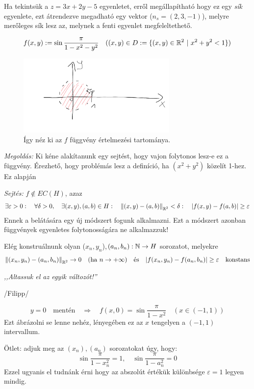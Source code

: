 \documentclass[a4paper,11.5pt]{article}
\newcommand{\norm}[1]{\left\lVert#1\right\rVert}
\begin{document}
	\begin{note}
		Ha tekintsük a $z=3x+2y-5$ egyenletet, erről megállapítható hogy ez egy \textit{sík} egyenlete, ezt átrendezve megadható egy vektor ($n_s=(2,3,-1)$), melyre merőleges sík lesz az, melynek a fenti egyenlet megfeleltethető.
	\end{note}
	\begin{task}
		\[ f(x,y):=\sin\frac{\pi}{1-x^2-y^2} \quad ((x,y)\in D:=\{ (x,y)\in\mathbb{R}^2 \ | \ x^2+y^2<1 \}) \]
		
		
		\begin{figure}[H]
			\centering
			\includegraphics[height=4cm]{../2zh/kepek/53.png}
			\caption{Így néz ki az $f$ függvény értelmezési tartománya.}
		\end{figure}
		
		
		\textit{Megoldás:} Ki kéne alakítanunk egy sejtést, hogy vajon folytonos lesz-e ez a függvény. Érezhető, hogy problémás lesz a definíció, ha $(x^2+y^2)$ közelít 1-hez. Ez alapján
		
		\textit{Sejtés:} $f\notin EC(H)$, azaz
		\[ \exists\varepsilon>0:\quad \forall\delta>0,\quad \exists(x,y),(a,b)\in H:\quad \norm{(x,y)-(a,b)}_{\R^2}<\delta:\quad |f(x,y)-f(a,b)|\geq \varepsilon  \]
		Ennek a belátására egy új módszert fogunk alkalmazni. Ezt a módszert azonban függvények egyenletes folytonosságára ne alkalmazzuk!
		
		Elég konstruálnunk olyan ($x_n,y_n$),$(a_n,b_n):\mathbb{N}\to H$ sorozatot, melyekre
		\[ \norm{(x_n,y_n)-(a_n,b_n)}_{\R^2}\to0\quad (\text{ha } n\to+\infty)\quad \text{és}\quad |f(x_n,y_n)-f(a_n,b_n)|\geq \varepsilon\quad \text{konstans} \] 
		\begin{center}
			\textit{,,Altassuk el az egyik változót!''}
			
			/Filipp/
		\end{center}
		\[ y=0\quad \text{mentén}\quad \Rightarrow\quad f(x,0)=\sin\frac{\pi}{1-x^2}\quad (x\in(-1,1)) \]
		Ezt ábrázolni se lenne nehéz, lényegében ez az $x$ tengelyen a $(-1,1)$ intervallum.
		
		Ötlet: adjuk meg az $(x_n),(a_n)$ sorozatokat úgy, hogy:
		\[ \sin\frac{\pi}{1-x_n^2}=1,\quad \sin\frac{\pi}{1-a_n^2}=0 \] 
		Ezzel ugyanis el tudnánk érni hogy az abszolút értékük különbsége $\varepsilon=1$ legyen mindig.
		

\end{task}
\end{document}
